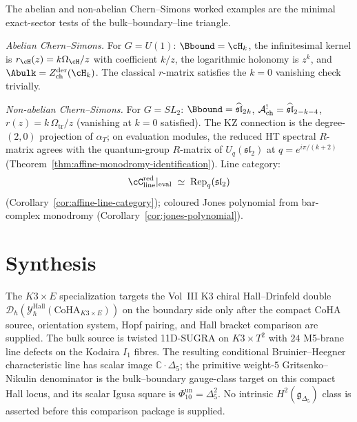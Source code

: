 \begin{remark}
\label{rem:moved-preface-abelian-nonabelian-cs}
The abelian and non-abelian Chern--Simons worked examples are the
minimal exact-sector tests of the bulk--boundary--line triangle.

\smallskip
\noindent\emph{Abelian Chern--Simons.}
For $G = U(1)$: $\Bbound = \cH_k$, the infinitesimal kernel is
$r_{\cH}(z)=k\Omega_{\cH}/z$ with coefficient $k/z$, the logarithmic
holonomy is $z^k$, and
$\Abulk=Z^{\mathrm{der}}_{\mathrm{ch}}(\cH_k)$. The classical
$r$-matrix satisfies the $k=0$ vanishing check trivially.

\smallskip
\noindent\emph{Non-abelian Chern--Simons.}
For $G = SL_2$: $\Bbound = \widehat{\mathfrak{sl}}_2{}_k$, $\mathcal{A}^!_{\mathrm{ch}} = \widehat{\mathfrak{sl}}_2{}_{-k-4}$, $r(z) = k\,\Omega_{\mathrm{tr}}/z$ (vanishing at $k = 0$ satisfied). The KZ connection is the degree-$(2,0)$ projection of $\alpha_T$; on evaluation modules, the reduced HT spectral $R$-matrix agrees with the quantum-group $R$-matrix of $U_q(\mathfrak{sl}_2)$ at $q = e^{i\pi/(k+2)}$ (Theorem~\ref{thm:affine-monodromy-identification}). Line category:
\[
\cC_{\mathrm{line}}^{\mathrm{red}}|_{\mathrm{eval}}
\;\simeq\;
\operatorname{Rep}_q(\mathfrak{sl}_2)
\]
(Corollary~\ref{cor:affine-line-category}); coloured Jones polynomial from bar-complex monodromy (Corollary~\ref{cor:jones-polynomial}).
\end{remark}

\section{Synthesis}
\label{sec:htbb-core-supplement}

\begin{remark}
\label{rem:htbb-core-hall-drinfeld}
The $K3 \times E$ specialization targets the Vol~III K3 chiral
Hall--Drinfeld double
$\mathcal{D}_\hbar(\mathcal{Y}^{\mathrm{Hall}}_\hbar(\mathrm{CoHA}_{K3 \times E}))$
on the boundary side only after the compact CoHA source, orientation
system, Hopf pairing, and Hall bracket comparison are supplied. The
bulk source is twisted 11D-SUGRA on $K3 \times T^2$ with $24$
M5-brane line defects on the Kodaira $I_1$ fibres. The resulting
conditional Bruinier--Heegner characteristic line has scalar image
\(\mathbb C\cdot\Delta_5\); the primitive weight-$5$
Gritsenko--Nikulin denominator is the bulk--boundary gauge-class target on
this compact Hall locus, and its scalar Igusa square is
$\Phi_{10}^{\mathrm{un}}=\Delta_5^2$. No intrinsic
\(H^2(\mathfrak g_{\Delta_5})\) class is asserted before this comparison
package is supplied.
\end{remark}

